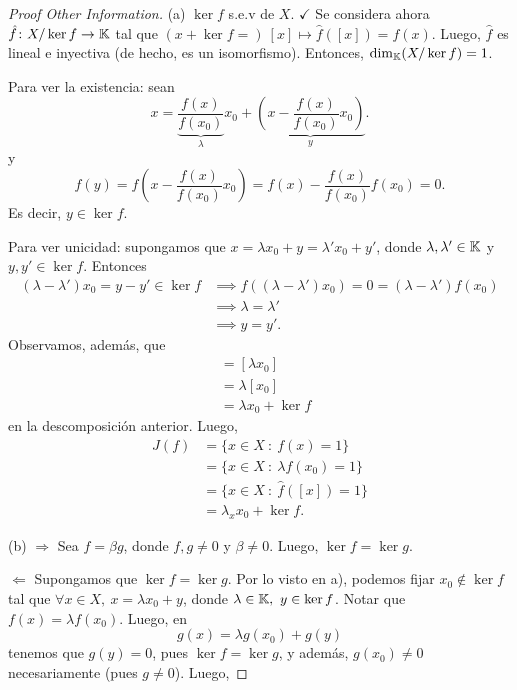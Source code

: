\begin{proof}[Proof Other Information]
	(a) $\ker f$ s.e.v de $X$. $\checkmark$ Se considera ahora $\hat{f} \colon X \slash \ker f \to \mathbb{K}$ tal que $(x + \ker f =)\ [x] \mapsto \hat{f}([x]) = f(x)$. Luego, $\hat{f}$ es lineal e inyectiva (de hecho, es un isomorfismo). Entonces, $\dim_{\mathbb{K}}(X \slash \ker f) = 1$. \par
	Para ver la existencia: sean
	\[ x = \underbrace{\frac{f(x)}{f(x_{0})}}_{\lambda} x_{0} + \underbrace{\left( x - \frac{f(x)}{f(x_{0})} x_{0} \right)}_{y}. \]
	y
	\[ f(y) = f \left( x - \frac{f(x)}{f(x_{0})} x_{0} \right) = f(x) - \frac{f(x)}{f(x_{0})} f(x_{0}) = 0. \]
	Es decir, $y \in \ker f$. \par
	Para ver unicidad: supongamos que $x = \lambda x_{0} + y = \lambda' x_{0} + y'$, donde $\lambda, \lambda' \in \mathbb{K}$ y $y,y' \in \ker f$. Entonces
	\begin{align*}
		(\lambda - \lambda')x_{0} = y - y' \in \ker f &\implies f((\lambda - \lambda') x_{0}) = 0 = (\lambda - \lambda') f(x_{0}) \\
		&\implies \lambda = \lambda' \\
		&\implies y = y'
	.\end{align*}
	Observamos, además, que
	\begin{align*}
		[x] &= [\lambda x_{0}] \\
		&= \lambda [x_{0}] \\
		&= \lambda x_{0} + \ker f
	\end{align*}
	en la descomposición anterior. Luego,
	\begin{align*}
		J(f) &= \{x \in X \ : \ f(x) = 1\} \\
		&= \{x \in X \ : \ \lambda f(x_{0}) = 1\} \\
		&= \{x \in X \ : \ \hat{f}([x]) = 1\} \\
		&= \lambda_{x} x_{0} + \ker f
	.\end{align*}
	\par (b) $\boxed{\Rightarrow}$ Sea $f = \beta g$, donde $f,g \neq 0$ y $\beta \neq 0$. Luego, $\ker f = \ker g$. \par
	$\boxed{\Leftarrow}$ Supongamos que $\ker f = \ker g$. Por lo visto en a), podemos fijar $x_{0} \not\in \ker f$ tal que $\forall x \in X,\ x = \lambda x_{0} + y$, donde $\lambda \in \mathbb{K},\ y \in \ker f$. Notar que $f(x) = \lambda f(x_{0})$. Luego, en
	\[ g(x) = \lambda g(x_{0}) + g(y) \]
	tenemos que $g(y) = 0$, pues $\ker f = \ker g$, y además, $g(x_{0}) \neq 0$ necesariamente (pues $g \neq 0$). Luego,
\end{proof}
